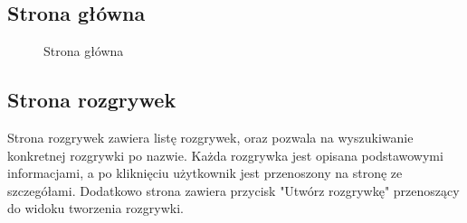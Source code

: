 \documentclass[shortabstract]{iithesis}
\begin{document}
\subsection{Strona główna}
\begin{figure}[H]
    \centering
    \hfill
    \caption{Strona główna}
\end{figure}

\subsection{Strona rozgrywek}
Strona rozgrywek zawiera listę rozgrywek, oraz pozwala na wyszukiwanie konkretnej rozgrywki po nazwie.
Każda rozgrywka jest opisana podstawowymi informacjami, a po kliknięciu użytkownik jest przenoszony na stronę ze szczegółami.
Dodatkowo strona zawiera przycisk "Utwórz rozgrywkę" przenoszący do widoku tworzenia rozgrywki.
\end{document}
